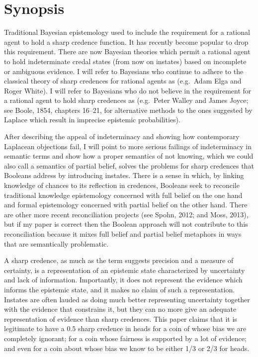 \section{Synopsis}
\label{Synopsis}

Traditional Bayesian epistemology used to include the
requirement for a rational agent to hold a sharp
credence function. It has recently become popular to
drop this requirement. There are now Bayesian theories
which permit a rational agent to hold indeterminate
credal states (from now on instates) based on
incomplete or ambiguous evidence. I will refer to
Bayesians who continue to adhere to the classical
theory of sharp credences for rational agents as
 (e.g.\ Adam Elga and Roger White). I
will refer to Bayesians who do not believe in the
requirement for a rational agent to hold sharp
credences as  (e.g.\ Peter Walley and
James Joyce; see Boole, 1854, chapters 16--21, for
alternative methods to the ones suggested by Laplace
which result in imprecise epistemic probabilities).

After describing the appeal of indeterminacy and
showing how contemporary Laplacean objections fail, I
will point to more serious failings of indeterminacy in
semantic terms and show how a proper semantics of not
knowing, which we could also call a semantics of
partial belief, solves the problems for sharp credences
that Booleans address by introducing instates. There is
a sense in which, by linking knowledge of chances to
its reflection in credences, Booleans seek to reconcile
traditional knowledge epistemology concerned with full
belief on the one hand and formal epistemology
concerned with partial belief on the other hand. There
are other more recent reconciliation projects (see
Spohn, 2012; and Moss, 2013), but if my paper is
correct then the Boolean approach will not contribute
to this reconciliation because it mixes full belief and
partial belief metaphors in ways that are semantically
problematic.

A sharp credence, as much as the term suggests
precision and a measure of certainty, is a
representation of an epistemic state characterized by
uncertainty and lack of information. Importantly, it
does not represent the evidence which informs the
epistemic state, and it makes no claim of such a
representation. Instates are often lauded as doing much
better representing uncertainty together with the
evidence that constrains it, but they can no more give
an adequate representation of evidence than sharp
credences. This paper claims that it is legitimate to
have a $0.5$ sharp credence in heads for a coin of
whose bias we are completely ignorant; for a coin whose
fairness is supported by a lot of evidence; and even
for a coin about whose bias we know to be either 1/3 or
2/3 for heads.

